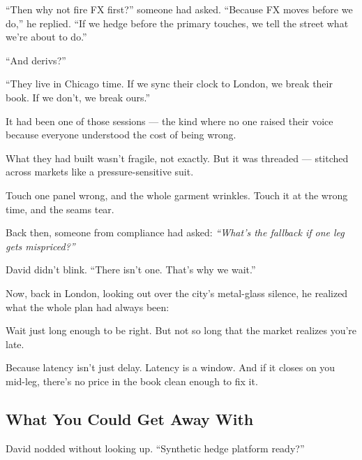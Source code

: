 “Then why not fire FX first?” someone had asked.
“Because FX moves before we do,” he replied. “If we hedge before the primary touches, we tell the 
street what we’re about to do.”

“And derivs?”

“They live in Chicago time. If we sync their clock to London, we break their book. If we don’t, 
we break ours.”

It had been one of those sessions — the kind where no one raised their voice because everyone 
understood the cost of being wrong.

What they had built wasn’t fragile, not exactly.
But it was threaded — stitched across markets like a pressure-sensitive suit.

Touch one panel wrong, and the whole garment wrinkles.
Touch it at the wrong time, and the seams tear.

Back then, someone from compliance had asked:
\textit{“What’s the fallback if one leg gets mispriced?”}

David didn’t blink.
“There isn’t one. That’s why we wait.”

Now, back in London, looking out over the city’s metal-glass silence,
he realized what the whole plan had always been:

Wait just long enough to be right.
But not so long that the market realizes you’re late.

Because latency isn’t just delay.
Latency is a window.
And if it closes on you mid-leg,
there’s no price in the book clean enough to fix it.





\subsection{What You Could Get Away With}


David nodded without looking up. “Synthetic hedge platform ready?”

\medskip

